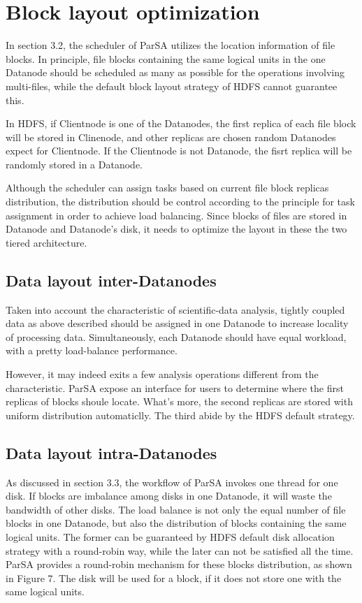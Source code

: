 \documentclass[preprint,12pt]{elsarticle}
\begin{document}
\section{Block layout optimization}
In section 3.2, the scheduler of ParSA utilizes the location information of file blocks. In principle, file blocks containing the same
logical units in the one Datanode should be scheduled as many as possible for the operations involving multi-files, while the default
block layout strategy of HDFS cannot guarantee this. \par
In HDFS, if Clientnode is one of the Datanodes, the first replica of each file block will be stored in Clinenode, and other replicas are 
chosen random Datanodes expect for Clientnode. If the Clientnode is not Datanode, the fisrt replica will be randomly stored in a 
Datanode. \par
Although the scheduler can assign tasks based on current file block replicas distribution, the distribution should be control according 
to the principle for task assignment in order to achieve load balancing. Since blocks of files are stored in Datanode and Datanode's disk,
it needs to optimize the layout in these the two tiered architecture. 

\subsection{Data layout inter-Datanodes}
Taken into account the characteristic of scientific-data analysis, tightly coupled data as above described should be assigned in one 
Datanode to increase locality of processing data. Simultaneously, each Datanode should have equal workload, with a pretty load-balance 
performance. \par 
However, it may indeed exits a few analysis operations different from the characteristic. ParSA expose an interface for users to determine
where the first replicas of blocks shoule locate. What's more, the second replicas are stored with uniform distribution automaticlly.
The third abide by the HDFS default strategy.  

\subsection{Data layout intra-Datanodes}
As discussed in section 3.3, the workflow of ParSA invokes one thread for one disk. If blocks are imbalance among disks in one Datanode, 
it will waste the bandwidth of other disks. The load balance is not only the equal number of file blocks in one Datanode, but also the 
distribution of blocks containing the same logical units. The former can be guaranteed by HDFS default disk allocation strategy with a
round-robin way, while the later can not be satisfied all the time. ParSA provides a round-robin mechanism for these blocks distribution,
as shown in Figure 7. The disk will be used for a block, if it does not store one with the same logical units. \par
\end{document}
